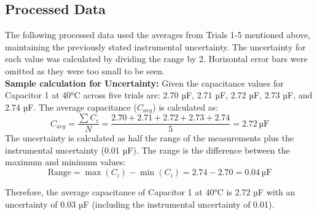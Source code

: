 \documentclass[12pt]{article}
\numberwithin{equation}{section}
\begin{document}
\FloatBarrier
\subsection{Processed Data}
The following processed data used the averages from Trials 1-5 mentioned above, maintaining the previously stated instrumental uncertainty. The uncertainty for each value was calculated by dividing the range by 2. Horizontal error bars were omitted as they were too small to be seen.\\
\textbf{Sample calculation for Uncertainty:}
Given the capacitance values for Capacitor 1 at 40°C across five trials are: 2.70 µF, 2.71 µF, 2.72 µF, 2.73 µF, and 2.74 µF. The average capacitance (\(C_{avg}\)) is calculated as:
\[
C_{avg} = \frac{\sum C_i}{N} = \frac{2.70 + 2.71 + 2.72 + 2.73 + 2.74}{5} = 2.72 \, \text{µF}
\]
The uncertainty is calculated as half the range of the measurements plus the instrumental uncertainty (0.01 µF). The range is the difference between the maximum and minimum values:
\[
\text{Range} = \max(C_i) - \min(C_i) = 2.74 - 2.70 = 0.04 \, \text{µF}
\]

\noindent Therefore, the average capacitance of Capacitor 1 at 40°C is 2.72 µF with an uncertainty of 0.03 µF (including the instrumental uncertainty of 0.01).
\end{document}

